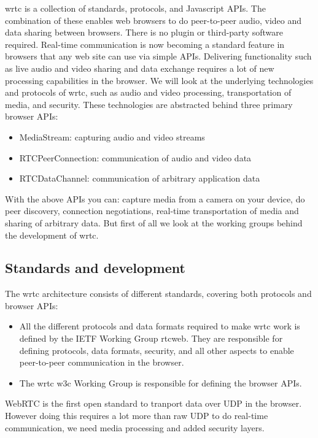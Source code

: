 
\gls{wrtc} is a collection of standards, protocols, and Javascript APIs. The combination of these enables web browsers to do peer-to-peer audio, video and data sharing between browsers. There is no plugin or third-party software required. Real-time communication is now becoming a standard feature in browsers that any web site can use via simple APIs. Delivering functionality such as live audio and video sharing and data exchange requires a lot of new processing capabilities in the browser. We will look at the underlying technologies and protocols of \gls{wrtc}, such as audio and video processing, transportation of media, and security. These technologies are abstracted behind three primary browser APIs:

\newpage
\begin{itemize}
\item MediaStream: capturing audio and video streams
\item RTCPeerConnection: communication of audio and video data
\item RTCDataChannel: communication of arbitrary application data
\end{itemize}

With the above APIs you can: capture media from a camera on your device, do peer discovery, connection negotiations, real-time transportation of media and sharing of arbitrary data. But first of all we look at the working groups behind the development of \gls{wrtc}.

\subsection{Standards and development}
The \gls{wrtc} architecture consists of different standards, covering both protocols and browser APIs:

\begin{itemize}
\item All the different protocols and data formats required to make \gls{wrtc} work is defined by the IETF Working Group \gls{rtcweb}. They are responsible for defining protocols, data formats, security, and all other aspects to enable peer-to-peer communication in the browser.
\item The \gls{wrtc} \gls{w3c} Working Group is responsible for defining the browser APIs.
\end{itemize}

WebRTC is the first open standard to tranport data over UDP in the browser. However doing this requires a lot more than raw UDP to do real-time communication, we need media processing and added security layers.

